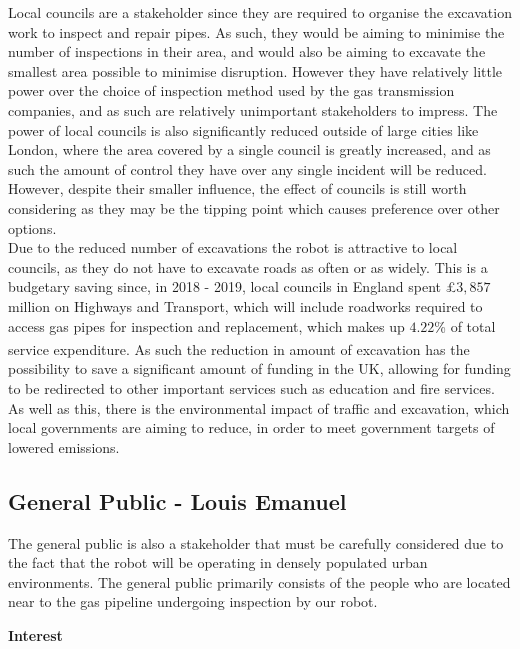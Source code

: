 \documentclass[11pt]{article}		%
\newcommand{\supercite}[1]{\textsuperscript{\cite{#1}}}		%
\begin{document}
			Local councils are a stakeholder since they are required to organise the excavation work to inspect and repair pipes.
			As such, they would be aiming to minimise the number of inspections in their area, and would also be aiming to excavate the smallest area possible to minimise disruption.
			However they have relatively little power over the choice of inspection method used by the gas transmission companies, and as such are relatively unimportant stakeholders to impress.
			The power of local councils is also significantly reduced outside of large cities like London, where the area covered by a single council is greatly increased, and as such the amount of control they have over any single incident will be reduced.
			However, despite their smaller influence, the effect of councils is still worth considering as they may be the tipping point which causes preference over other options.
			\\
			Due to the reduced number of excavations the robot is attractive to local councils, as they do not have to excavate roads as often or as widely.
			This is a budgetary saving since, in 2018 - 2019, local councils in England spent £$3,857$ million on Highways and Transport, which will include roadworks required to access gas pipes for inspection and replacement, which makes up $4.22$\% of total service expenditure\supercite{ministry2020local}.
			As such the reduction in amount of excavation has the possibility to save a significant amount of funding in the UK, allowing for funding to be redirected to other important services such as education and fire services.
			As well as this, there is the environmental impact of traffic and excavation, which local governments are aiming to reduce, in order to meet government targets of lowered emissions.
		
		\subsection[General Public]{General Public - Louis Emanuel}
		The general public is also a stakeholder that must be carefully considered due to the fact that the robot will be operating in densely populated urban environments. The general public primarily consists of the people who are located near to the gas pipeline undergoing inspection by our robot.
		
		\textbf{Interest}
		
\end{document}
